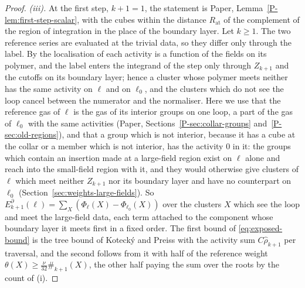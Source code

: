 \documentclass[11pt]{preprint}
\numberwithin{equation}{section}
\theoremstyle{definition}
\theoremstyle{remark}
\theoremstyle{plain}
\begin{document}
\begin{proof}
\emph{(iii).} At the first step, $k + 1 = 1$, the statement is Paper, Lemma~\ref{P-lem:first-step-scalar}, with the cubes within the distance $R_{\mathrm{at}}$ of the complement of the region of integration in the place of the boundary layer. Let $k \geq 1$. The two reference series are evaluated at the trivial data, so they differ only through the label. By the localisation of \cite[(1.9)--(1.10)]{BalabanRG2} each activity is a function of the fields on its polymer, and the label enters the integrand of the step only through $Z_{k+1}$ and the cutoffs on its boundary layer; hence a cluster whose polymer meets neither has the same activity on $\ell$ and on $\ell_0$, and the clusters which do not see the loop cancel between the numerator and the normaliser. Here we use that the reference gas of $\ell$ is the gas of its interior groups on one loop, a part of the gas of $\ell_0$ with the same activities (Paper, Sections~\ref{P-sec:collar-groups} and~\ref{P-sec:old-regions}), and that a group which is not interior, because it has a cube at the collar or a member which is not interior, has the activity $0$ in it: the groups which contain an insertion made at a large-field region exist on $\ell$ alone and reach into the small-field region with it, and they would otherwise give clusters of $\ell$ which meet neither $Z_{k+1}$ nor its boundary layer and have no counterpart on $\ell_0$ (Section~\ref{sec:weights-large-fields}). So $E^\partial_{k+1}(\ell) = \sum_X(\Phi_\ell(X) - \Phi_{\ell_0}(X))$ over the clusters $X$ which see the loop and meet the large-field data, each term attached to the component whose boundary layer it meets first in a fixed order. The first bound of \eqref{eq:exposed-bound} is the tree bound of Koteck\'y and Preiss \cite{KoteckyPreiss} with the activity sum $C\hat\rho_{k+1}$ per traversal, and the second follows from it with half of the reference weight $\theta(X) \geq \frac{\nu}{32}\#_{k+1}(X)$, the other half paying the sum over the roots by the count of (i).


\end{proof}
\end{document}
